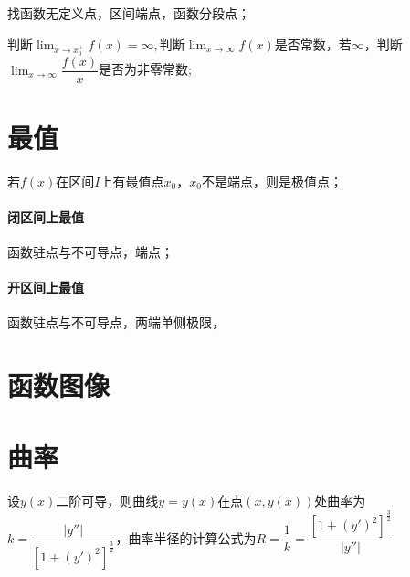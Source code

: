找函数无定义点，区间端点，函数分段点；

判断\(\displaystyle\lim_{x \to x_0^+}f(x) = \infty, \text{判断}\lim_{x \to \infty}f(x)\)是否常数，若\(\infty\)，判断\(\displaystyle\lim_{x \to \infty}\dfrac{f(x)}{x}\)是否为非零常数;


\section{最值}
若\(f(x)\)在区间\(I\)上有最值点\(x_0\)，\(x_0\)不是端点，则是极值点；

\paragraph{闭区间上最值}
函数驻点与不可导点，端点；

\paragraph{开区间上最值}
函数驻点与不可导点，两端单侧极限，


\section{函数图像}


\section{曲率}
设\(y(x)\)二阶可导，则曲线\(y = y(x)\)在点\((x, y(x))\)处曲率为\(k = \dfrac{|y''|}{[1 + (y')^2]^{\frac{3}{2}}}\)，曲率半径的计算公式为\(R = \dfrac{1}{k} = \dfrac{[1 + (y')^2]^{\frac{3}{2}}}{|y''|}\)


